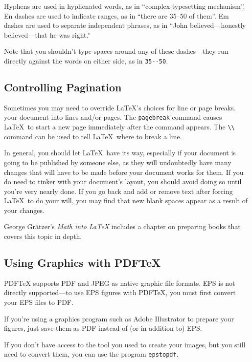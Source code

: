 \documentclass{icmmcm}
\newcommand{\bslash}{\symbol{'134}}%
\newcommand{\bsl}{{\texttt{\bslash}}}
\newcommand{\com}[1]{\bsl\texttt{#1}\xspace}
\newcommand{\pdftex}{PDF\tex}
\newcommand{\prog}[1]{\texttt{#1}\xspace}
\newcommand{\tex}{\TeX\xspace}
\begin{document}
{Hyphens are used in hyphenated words, as in ``complex-typesetting
mechanism''.  En dashes are used to indicate ranges, as in ``there are
35--50 of them''.  Em dashes are used to separate independent phrases,
as in ``John believed---honestly believed---that he was right.''

Note that you shouldn't type spaces around any of these dashes---they
run directly against the words on either side, as in \verb+35--50+.


\subsection{Controlling Pagination}%
\label{sec:pagination}

Sometimes you may need to override \LaTeX's choices for line or page
breaks. your document into lines and/or pages.  The \com{pagebreak}
command causes \LaTeX\ to start a new page immediately after the
command appears.  The \verb|\\| command can be used to tell \LaTeX\
where to break a line.

In general, you should let \LaTeX\ have its way, especially if your
document is going to be published by someone else, as they will
undoubtedly have many changes that will have to be made before your
document works for them.  If you do need to tinker with your
document's layout, you should avoid doing so until you're very nearly
done.  If you go back and add or remove text after forcing \LaTeX\ to
do your will, you may find that new blank spaces appear as a result of
your changes.

George Gr\"{a}tzer's \emph{Math into \LaTeX} includes a chapter on
preparing books that covers this topic in depth.


\subsection{Using Graphics with \pdftex}%
\label{sec:pdftex-graphics}

\pdftex supports PDF and JPEG as native graphic file formats.  EPS is
not directly supported---to use EPS figures with \pdftex, you must
first convert your EPS files to PDF.  

If you're using a graphics program such as Adobe Illustrator to
prepare your figures, just save them as PDF instead of (or in addition
to) EPS.

If you don't have access to the tool you used to create your images,
but you still need to convert them, you can use the program
\prog{epstopdf}.

}
\end{document}
